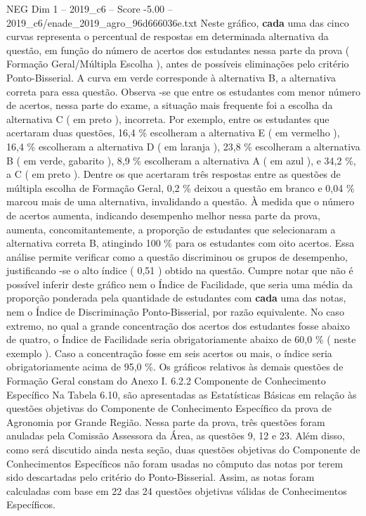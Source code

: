 \begin{textsample}{NEG Dim 1 – 2019\_c6 – Score -5.00 – 2019\_c6/enade\_2019\_agro\_96d666036e.txt}
Neste gráfico, \textbf{cada} uma das cinco curvas representa o percentual de respostas em determinada alternativa da questão, em função do número de acertos dos estudantes nessa parte da prova ( Formação Geral/Múltipla Escolha ), antes de possíveis eliminações pelo critério Ponto-Bisserial.
A curva em verde corresponde à alternativa B, a alternativa correta para essa questão.
Observa -se que entre os estudantes com menor número de acertos, nessa parte do exame, a situação mais frequente foi a escolha da alternativa C ( em preto ), incorreta.
Por exemplo, entre os estudantes que acertaram duas questões, 16,4 \% escolheram a alternativa E ( em vermelho ), 16,4 \% escolheram a alternativa D ( em laranja ), 23,8 \% escolheram a alternativa B ( em verde, gabarito ), 8,9 \% escolheram a alternativa A ( em azul ), e 34,2 \%, a C ( em preto ).
Dentre os que acertaram três respostas entre as questões de múltipla escolha de Formação Geral, 0,2 \% deixou a questão em branco e 0,04 \% marcou mais de uma alternativa, invalidando a questão.
À medida que o número de acertos aumenta, indicando desempenho melhor nessa parte da prova, aumenta, concomitantemente, a proporção de estudantes que selecionaram a alternativa correta B, atingindo 100 \% para os estudantes com oito acertos.
Essa análise permite verificar como a questão discriminou os grupos de desempenho, justificando -se o alto índice ( 0,51 ) obtido na questão.
Cumpre notar que não é possível inferir deste gráfico nem o Índice de Facilidade, que seria uma média da proporção ponderada pela quantidade de estudantes com \textbf{cada} uma das notas, nem o Índice de Discriminação Ponto-Bisserial, por razão equivalente.
No caso extremo, no qual a grande concentração dos acertos dos estudantes fosse abaixo de quatro, o Índice de Facilidade seria obrigatoriamente abaixo de 60,0 \% ( neste exemplo ).
Caso a concentração fosse em seis acertos ou mais, o índice seria obrigatoriamente acima de 95,0 \%.
Os gráficos relativos às demais questões de Formação Geral constam do Anexo I. 6.2.2 Componente de Conhecimento Específico Na Tabela 6.10, são apresentadas as Estatísticas Básicas em relação às questões objetivas do Componente de Conhecimento Específico da prova de Agronomia por Grande Região.
Nessa parte da prova, três questões foram anuladas pela Comissão Assessora da Área, as questões 9, 12 e 23.
Além disso, como será discutido ainda nesta seção, duas questões objetivas do Componente de Conhecimentos Específicos não foram usadas no cômputo das notas por terem sido descartadas pelo critério do Ponto-Bisserial.
Assim, as notas foram calculadas com base em 22 das 24 questões objetivas válidas de Conhecimentos Específicos.

\end{textsample}
